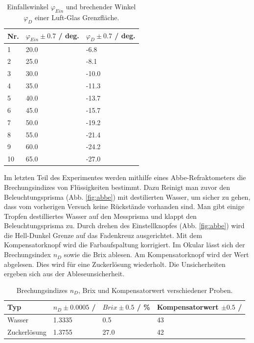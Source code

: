 \documentclass[12pt,a4paper,twoside]{article}
\begin{document}
\begin{table}[H]
    \centering
    \caption{Einfallswinkel $\varphi_{Ein}$ und brechender Winkel $\varphi_D$ einer Luft-Glas Grenzfläche. }
    \label{tab:brechender Winkel}
    \begin{tabular}{| l | l | l |}
        \hline
        Nr. &  $\varphi_{Ein} \pm 0.7$ / deg. & $\varphi_D \pm 0.7$ / deg.  \\
        \hline
        1   & 20.0  & -6.8  \\
        2   & 25.0  & -8.1  \\
        3   & 30.0  & -10.0 \\
        4   & 35.0  & -11.3 \\
        5   & 40.0  & -13.7 \\
        6   & 45.0  & -15.7 \\
        7   & 50.0  & -19.2 \\
        8   & 55.0  & -21.4 \\
        9   & 60.0  & -24.2 \\
        10  & 65.0  & -27.0 \\
        \hline
    \end{tabular}
\end{table}

\noindent
Im letzten Teil des Experimentes werden mithilfe eines Abbe-Refraktometers die Brechungsindizes von Flüssigkeiten bestimmt. 
Dazu Reinigt man zuvor den Beleuchtungsprisma (Abb. \ref{fig:abbe}) mit destilierten Wasser, um sicher zu gehen, dass vom vorherigen Versuch keine Rückstände vorhanden sind. 
Man gibt einige Tropfen destilliertes Wasser auf den Messprisma und klappt den Beleuchtungsprisma zu. Durch drehen des Einstellknopfes (Abb. \ref{fig:abbe}) wird die Hell-Dunkel Grenze auf das Fadenkreuz ausgerichtet. 
Mit dem Kompensatorknopf wird die Farbaufspaltung korrigiert. Im Okular lässt sich der Brechungsindex $n_D$ sowie die Brix ablesen. Am Kompensatorknopf wird der Wert abgelesen. 
Dies wird für eine Zuckerlösung wiederholt. Die Unsicherheiten ergeben sich aus der Ableseunsicherheit. 

\begin{table}[H]
    \centering
    \caption{Brechungsindizes $n_D$, Brix und Kompensatorwert verschiedener Proben. }
    \label{tab:abbe werte}
    \begin{tabular}{| l | l | l | l |}
        \hline
        Typ &  $n_D \pm 0.0005$ /  & $Brix \pm 0.5$ / \% & Kompensatorwert $\pm 0.5$ / \\
        \hline
        Wasser   & 1.3335  & 0.5 & 43  \\
        Zuckerlösung & 1.3755  & 27.0  & 42  \\
        \hline
    \end{tabular}
\end{table}
\end{document}
